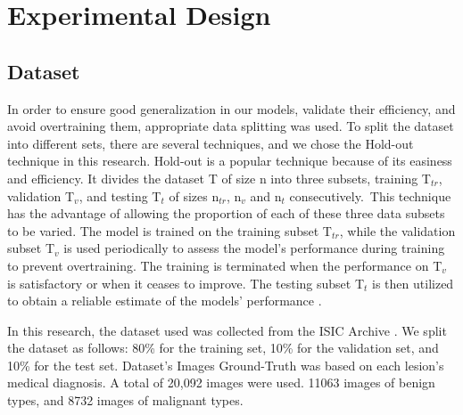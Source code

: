 \documentclass[12pt]{diazessay}
\begin{document}
   
    
    \newpage
    \section{Experimental Design}
    \subsection{Dataset}

    \hspace{0.7cm} In order to ensure good generalization in our models, validate their efficiency, and avoid overtraining them, %
    appropriate data splitting was used. To split the dataset into different sets,  there are several techniques, and we chose the Hold-out technique in this research. Hold-out is a popular technique because of its easiness and efficiency. It divides the dataset T of size n into three subsets,
    training T$_{tr}$, 
    validation T$_{v}$,
    and testing T$_{t}$ of sizes n$_{tr}$, n$_{v}$ and n$_{t}$ consecutively. This technique has the advantage of allowing the proportion of each of these three data subsets to be varied. The model is trained on the training subset T$_{tr}$, while the validation subset T$_{v}$ is used periodically to assess the model's performance during training to prevent overtraining. The training is terminated when the performance on T$_{v}$ is satisfactory or when it ceases to improve. The testing subset T$_{t}$ is then utilized to obtain a reliable estimate of the models' performance \cite{reitermanova2010data}.



    \hspace{0.2cm} In this research, the dataset used was collected from the ISIC Archive \cite{ISICdataset}. We split the dataset as follows: 80\% for the training set, 10\% for the validation set, and 10\% for the test set. Dataset's Images Ground-Truth was based on each lesion's medical diagnosis.
    A total of 20,092 images were used. 11063 images of benign types, and 8732 images of malignant types.
    
\end{document}
